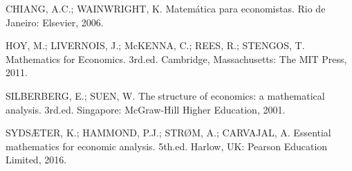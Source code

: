 \documentclass[12pt]{article}
\begin{document}
\begin{thebibliography}{}
CHIANG, A.C.; WAINWRIGHT, K. Matemática para economistas. Rio de Janeiro: Elsevier, 2006.

HOY, M.; LIVERNOIS, J.; McKENNA, C.; REES, R.; STENGOS, T. Mathematics for Economics. 3rd.ed. Cambridge, Massachusetts: The MIT Press, 2011.

SILBERBERG, E.; SUEN, W. The structure of economics: a mathematical analysis. 3rd.ed. Singapore: McGraw-Hill Higher Education, 2001.

SYDSÆTER, K.; HAMMOND, P.J.; STRØM, A.; CARVAJAL, A. Essential mathematics for economic analysis. 5th.ed. Harlow, UK: Pearson Education Limited, 2016.
\end{thebibliography}
\end{document}
